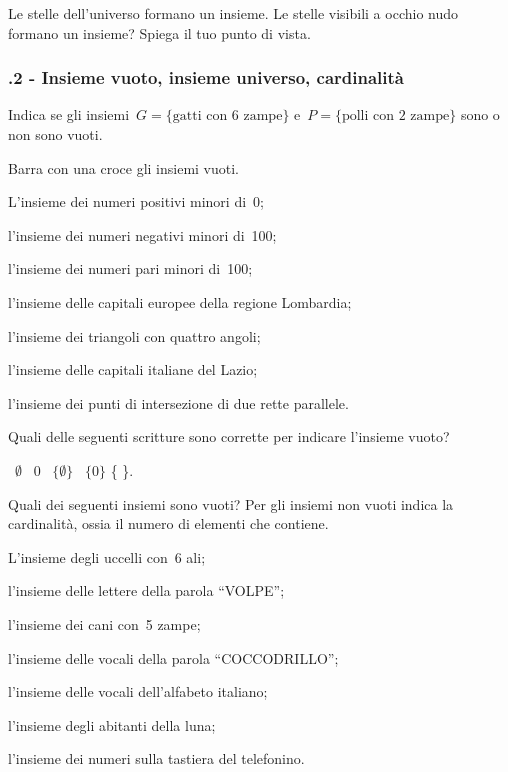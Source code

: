 \begin{esercizio}
\label{ese:\thechapter.8}
Le stelle dell'universo formano un insieme. Le stelle visibili a occhio nudo formano un insieme? Spiega il tuo punto di vista.
\end{esercizio}

\subsubsection*{\thechapter.2 - Insieme vuoto, insieme universo, cardinalità}
\begin{esercizio}
\label{ese:\thechapter.9}
Indica se gli insiemi~$G =\{\text{gatti con~6 zampe}\}$ e~$P = \{\text{polli con~2 zampe}\}$ sono o non sono vuoti.
\end{esercizio}

\begin{esercizio}
\label{ese:\thechapter.10}
Barra con una croce gli insiemi vuoti.
\begin{enumeratea}
 \item L'insieme dei numeri positivi minori di~0;
 \item l'insieme dei numeri negativi minori di~100;
 \item l'insieme dei numeri pari minori di~100;
 \item l'insieme delle capitali europee della regione Lombardia;
 \item l'insieme dei triangoli con quattro angoli;
 \item l'insieme delle capitali italiane del Lazio;
 \item l'insieme dei punti di intersezione di due rette parallele.
 \end{enumeratea}
\end{esercizio}

\begin{esercizio}
\label{ese:\thechapter.11}
Quali delle seguenti scritture sono corrette per indicare
l'insieme vuoto?
\begin{center}
 \boxA\quad~$\emptyset $ \quad\boxB\quad~0 \quad\boxC\quad~$\{\emptyset \}$ \quad\boxD\quad~$\{0\}$ \quad\boxE\quad \{ \}.
\end{center}
\end{esercizio}
\pagebreak
\begin{esercizio}
\label{ese:\thechapter.12}
Quali dei seguenti insiemi sono vuoti? Per gli insiemi non vuoti indica la cardinalità, ossia il numero di elementi che contiene.
\begin{enumeratea}
\item L'insieme degli uccelli con~6 ali;
\item l'insieme delle lettere della parola ``VOLPE'';
\item l'insieme dei cani con~5 zampe;
\item l'insieme delle vocali della parola ``COCCODRILLO'';
\item l'insieme delle vocali dell'alfabeto italiano;
\item l'insieme degli abitanti della luna;
\item l'insieme dei numeri sulla tastiera del telefonino.
\end{enumeratea}
\end{esercizio}

